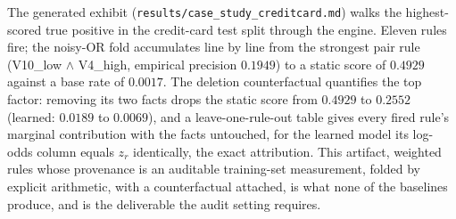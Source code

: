 The generated exhibit (\texttt{results/case\_study\_creditcard.md})
walks the highest-scored true positive in the credit-card test split
through the engine. Eleven rules fire; the noisy-OR fold accumulates
line by line from the strongest pair rule
(V10\_low $\wedge$ V4\_high, empirical precision $0.1949$) to a static
score of $0.4929$ against a base rate of $0.0017$. The deletion
counterfactual quantifies the top factor: removing its two facts drops
the static score from $0.4929$ to $0.2552$ (learned: $0.0189$ to
$0.0069$), and a leave-one-rule-out table gives every fired rule's
marginal contribution with the facts untouched, for the learned
model its log-odds column equals $z_r$ identically, the exact
attribution. This artifact, weighted rules whose provenance is
an auditable training-set measurement, folded by explicit arithmetic,
with a counterfactual attached, is what none of the baselines
produce, and is the deliverable the audit setting requires.

